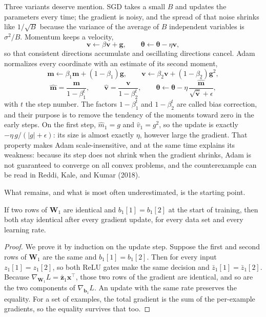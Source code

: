 
Three variants deserve mention. SGD takes a small $B$ and updates the parameters every time; the
gradient is noisy, and the spread of that noise shrinks like $1/\sqrt{B}$ because the variance of
the average of $B$ independent variables is $\sigma^{2}/B$. Momentum keeps a velocity,
\[
  \mathbf{v}\leftarrow\beta\mathbf{v}+\mathbf{g},\qquad
  \boldsymbol{\theta}\leftarrow\boldsymbol{\theta}-\eta\mathbf{v},
\]
so that consistent directions accumulate and oscillating directions cancel. Adam normalizes every
coordinate with an estimate of its second moment,
\[
  \mathbf{m}\leftarrow\beta_{1}\mathbf{m}+(1-\beta_{1})\mathbf{g},\qquad
  \mathbf{v}\leftarrow\beta_{2}\mathbf{v}+(1-\beta_{2})\mathbf{g}^{2},
\]
\[
  \hat{\mathbf{m}}=\frac{\mathbf{m}}{1-\beta_{1}^{t}},\qquad
  \hat{\mathbf{v}}=\frac{\mathbf{v}}{1-\beta_{2}^{t}},\qquad
  \boldsymbol{\theta}\leftarrow\boldsymbol{\theta}
  -\eta\,\frac{\hat{\mathbf{m}}}{\sqrt{\hat{\mathbf{v}}}+\epsilon},
\]
with $t$ the step number. The factors $1-\beta_{1}^{t}$ and $1-\beta_{2}^{t}$ are called bias
correction, and their purpose is to remove the tendency of the moments toward zero in the early
steps. On the first step, $\hat{m}_{1}=g$ and $\hat{v}_{1}=g^{2}$, so the update is exactly
$-\eta\,g/(\lvert g\rvert+\epsilon)$: its size is almost exactly $\eta$, however large the
gradient. That property makes Adam scale-insensitive, and at the same time explains its weakness:
because its step does not shrink when the gradient shrinks, Adam is not guaranteed to converge on
all convex problems, and the counterexample can be read in Reddi, Kale, and Kumar (2018).

What remains, and what is most often underestimated, is the starting point.

\begin{proposisi}
If two rows of $\mathbf{W}_{1}$ are identical and $b_{1}[1]=b_{1}[2]$ at the start of training,
then both stay identical after every gradient update, for every data set and every learning
rate.
\end{proposisi}

\begin{proof}
We prove it by induction on the update step. Suppose the first and second rows of
$\mathbf{W}_{1}$ are the same and $b_{1}[1]=b_{1}[2]$. Then for every input $z_{1}[1]=z_{1}[2]$,
so both ReLU gates make the same decision and $\bar{z}_{1}[1]=\bar{z}_{1}[2]$. Because
$\nabla_{\mathbf{W}_{1}}L=\bar{\mathbf{z}}_{1}\mathbf{x}^{\top}$, those two rows of the gradient
are identical, and so are the two components of $\nabla_{\mathbf{b}_{1}}L$. An update with the
same rate preserves the equality. For a set of examples, the total gradient is the sum of the
per-example gradients, so the equality survives that too.
\end{proof}

